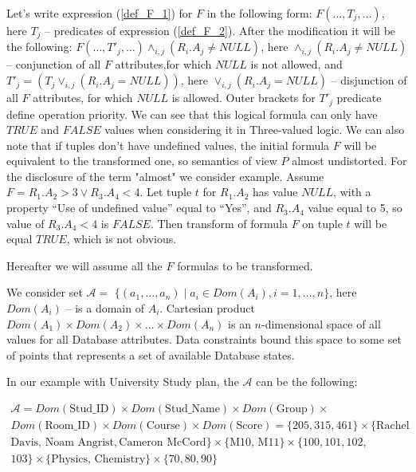 \documentclass[preprint,12pt]{elsarticle}
\def \n #1{\mathit{#1}}
\begin{document}
Let's write expression (\ref{def_F_1}) for $F$ in the following form: $ F (\dots
, T_j , \dots )$, here $T_j$ -- predicates of expression (\ref{def_F_2}). After
the modification it will be the following: $F( \dots, T'_j , \dots )\wedge_{i,j}
(R_i .A_j \neq \n{NULL})$, here $\wedge_{i,j}(R_i .A_j \neq \n{NULL})$
-- conjunction of all $F$ attributes,for which $\n{NULL}$ is not allowed, and
$T'_j = (T_j \vee_{i,j}(R_i .A_j = \n{NULL}))$, here $\vee_{i,j}(R_i .A_j =
\n{NULL})$ -- disjunction of all $F$ attributes, for which $\n{NULL}$ is allowed.
Outer brackets for $T'_j$ predicate define operation priority. We can see that
this logical formula can only have $\n{TRUE}$ and $\n{FALSE}$ values when
considering it in Three-valued logic. We can also note that if tuples don't have
undefined values, the initial formula $F$ will be equivalent to the transformed
one, so semantics of view $P$ almost undistorted. For the disclosure of the term
"almost" we consider example. Assume $F = R_1.A_2 > 3 \vee R_3.A_4 < 4$. Let
tuple $t$ for $R_1.A_2$ has value $\n{NULL}$, with a property ``Use of undefined
value'' equal to ``Yes'', and $R_3.A_4$ value equal to 5, so value of
$R_3.A_4 < 4$ is $\n{FALSE}$. Then transform of formula $F$ on tuple $t$ will be
equal $\n{TRUE}$, which is not obvious.

Hereafter we will assume all the $F$ formulas to be transformed.

We consider set $\mathcal{A} =$ $\{(a_1, \dots, a_n) \mid a_i \in Dom(A_i),
i=1,\dots,n\}$, here $Dom(A_i)$ -- is a domain of $A_i$. Cartesian product
$Dom(A_1)\times Dom(A_2)\times \dots \times Dom(A_n)$ is an $n$-dimensional
space of all values for all Database attributes. Data constraints bound this
space to some set of points that represents a set of available Database
states.

In our example with University Study plan, the $\mathcal{A}$ can be the
following:

\begin{multline*}
\mathcal{A} = Dom(\text{Stud\_ID})\times Dom(\text{Stud\_Name}) \times
Dom(\text{Group}) \times\\
Dom(\text{Room\_ID}) \times Dom(\text{Course}) \times Dom(\text{Score}) =
\{205, 315, 461\} \times \{\text{Rachel}\\
\text{Davis, Noam Angrist}, \text{Cameron McCord}\} \times\{\text{M10, M11}\}
\times \{100, 101, 102,\\
103\} \times \{\text{Physics, Chemistry}\} \times \{70, 80, 90\}
\end{multline*}
\end{document}
